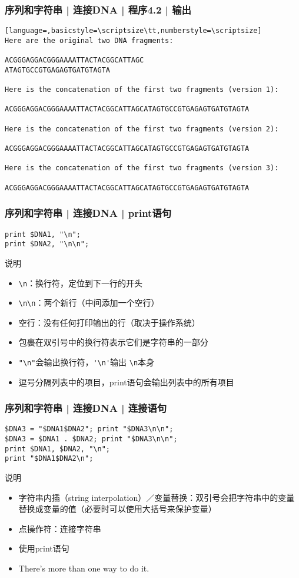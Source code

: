 \begin{frame}[fragile]
  \frametitle{序列和字符串 | 连接DNA | 程序4.2 | 输出}
\begin{lstlisting}[language=,basicstyle=\scriptsize\tt,numberstyle=\scriptsize]
Here are the original two DNA fragments:

ACGGGAGGACGGGAAAATTACTACGGCATTAGC
ATAGTGCCGTGAGAGTGATGTAGTA

Here is the concatenation of the first two fragments (version 1):

ACGGGAGGACGGGAAAATTACTACGGCATTAGCATAGTGCCGTGAGAGTGATGTAGTA

Here is the concatenation of the first two fragments (version 2):

ACGGGAGGACGGGAAAATTACTACGGCATTAGCATAGTGCCGTGAGAGTGATGTAGTA

Here is the concatenation of the first two fragments (version 3):

ACGGGAGGACGGGAAAATTACTACGGCATTAGCATAGTGCCGTGAGAGTGATGTAGTA
\end{lstlisting}
\end{frame}

\begin{frame}[fragile]
  \frametitle{序列和字符串 | 连接DNA | \alert{print语句}}
\begin{lstlisting}
print $DNA1, "\n";
print $DNA2, "\n\n";
\end{lstlisting}
\pause
\begin{block}{说明}
  \begin{itemize}
    \item \verb|\n|：换行符，定位到下一行的开头
    \item \verb|\n\n|：两个新行（中间添加一个空行）
    \item 空行：没有任何打印输出的行（取决于操作系统）
    \item 包裹在双引号中的换行符表示它们是字符串的一部分
    \item \verb|"\n"|会输出换行符，\verb|'\n'|输出 \verb|\n|本身
    \item 逗号分隔列表中的项目，print语句会输出列表中的所有项目
  \end{itemize}
\end{block}
\end{frame}

\begin{frame}[fragile]
  \frametitle{序列和字符串 | 连接DNA | \alert{连接语句}}
\begin{lstlisting}
$DNA3 = "$DNA1$DNA2"; print "$DNA3\n\n";
$DNA3 = $DNA1 . $DNA2; print "$DNA3\n\n";
print $DNA1, $DNA2, "\n";
print "$DNA1$DNA2\n";
\end{lstlisting}
\begin{block}{说明}
\begin{itemize}
  \item 字符串内插（string interpolation）／变量替换：双引号会把字符串中的变量替换成变量的值（必要时可以使用大括号来保护变量）
  \item 点操作符：连接字符串
  \item 使用print语句
  \item There's more than one way to do it.
\end{itemize}
\end{block}
\end{frame}

